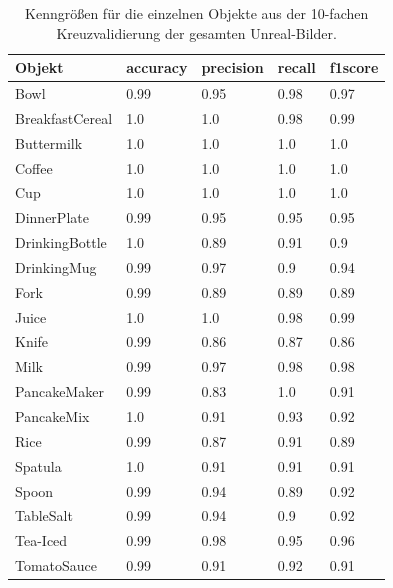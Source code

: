 \begin{table}
\begin{tabularx}{\textwidth}{Xllll}
\textbf{Objekt}	& \textbf{\gls{accuracy}} & \textbf{\gls{precision}}	& \textbf{\gls{recall}}	& \textbf{\gls{f1score}} \\ \hline
Bowl & 0.99 & 0.95 & 0.98 & 0.97 \\  
BreakfastCereal & 1.0 & 1.0 & 0.98 & 0.99 \\  
Buttermilk & 1.0 & 1.0 & 1.0 & 1.0 \\  
Coffee & 1.0 & 1.0 & 1.0 & 1.0 \\  
Cup & 1.0 & 1.0 & 1.0 & 1.0 \\  
DinnerPlate & 0.99 & 0.95 & 0.95 & 0.95 \\  
DrinkingBottle & 1.0 & 0.89 & 0.91 & 0.9 \\  
DrinkingMug & 0.99 & 0.97 & 0.9 & 0.94 \\  
Fork & 0.99 & 0.89 & 0.89 & 0.89 \\  
Juice & 1.0 & 1.0 & 0.98 & 0.99 \\  
Knife & 0.99 & 0.86 & 0.87 & 0.86 \\  
Milk & 0.99 & 0.97 & 0.98 & 0.98 \\  
PancakeMaker & 0.99 & 0.83 & 1.0 & 0.91 \\  
PancakeMix & 1.0 & 0.91 & 0.93 & 0.92 \\  
Rice & 0.99 & 0.87 & 0.91 & 0.89 \\  
Spatula & 1.0 & 0.91 & 0.91 & 0.91 \\  
Spoon & 0.99 & 0.94 & 0.89 & 0.92 \\  
TableSalt & 0.99 & 0.94 & 0.9 & 0.92 \\  
Tea-Iced & 0.99 & 0.98 & 0.95 & 0.96 \\  
TomatoSauce & 0.99 & 0.91 & 0.92 & 0.91 \\  
\end{tabularx}
\caption[Objekt-spezifische Kenngrößen des gesamten Unreal-Bilder Datensatzes]{Kenngrößen für die einzelnen Objekte aus der 10-fachen Kreuzvalidierung der gesamten Unreal-Bilder.}
\label{tab:unreal_1_classMetrics}
\end{table}


